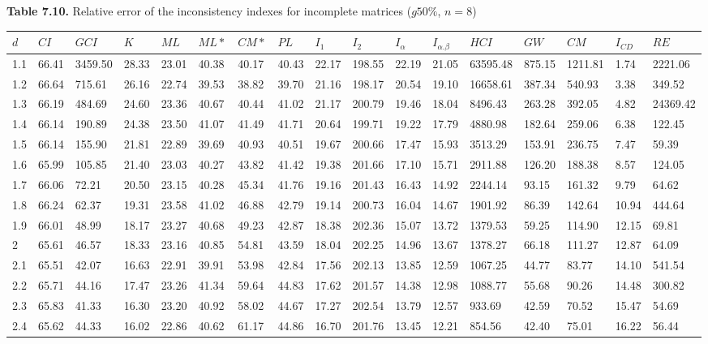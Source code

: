 \newpage
\textbf{Table 7.10.} Relative error of the inconsistency indexes for incomplete matrices ($g50\%$, $n=8$)
\begin{adjustbox}{angle=90}
  \begin{center}
    \small{    
    \begin{tabular}{|l|llllllllllllllll|}
      \hline $d$ &
$CI$&$GCI$&$K$&$ML$&$ML*$&$CM*$&$PL$&$I_1$&$I_2$&$I_{\alpha}$&$I_{\alpha.\beta}$&$HCI$&$GW$&$CM$&$I_{CD}$&$RE$\\ \hline \hline
1.1&66.41&3459.50&28.33&23.01&40.38&40.17&40.43&22.17&198.55&22.19&21.05&63595.48&875.15&1211.81&1.74&2221.06  \\ 
1.2&66.64&715.61&26.16&22.74&39.53&38.82&39.70&21.16&198.17&20.54&19.10&16658.61&387.34&540.93&3.38&349.52  \\ 
1.3&66.19&484.69&24.60&23.36&40.67&40.44&41.02&21.17&200.79&19.46&18.04&8496.43&263.28&392.05&4.82&24369.42  \\ 
1.4&66.14&190.89&24.38&23.50&41.07&41.49&41.71&20.64&199.71&19.22&17.79&4880.98&182.64&259.06&6.38&122.45  \\ 
1.5&66.14&155.90&21.81&22.89&39.69&40.93&40.51&19.67&200.66&17.47&15.93&3513.29&153.91&236.75&7.47&59.39  \\ 
1.6&65.99&105.85&21.40&23.03&40.27&43.82&41.42&19.38&201.66&17.10&15.71&2911.88&126.20&188.38&8.57&124.05  \\ 
1.7&66.06&72.21&20.50&23.15&40.28&45.34&41.76&19.16&201.43&16.43&14.92&2244.14&93.15&161.32&9.79&64.62  \\ 
1.8&66.24&62.37&19.31&23.58&41.02&46.88&42.79&19.14&200.73&16.04&14.67&1901.92&86.39&142.64&10.94&444.64  \\ 
1.9&66.01&48.99&18.17&23.27&40.68&49.23&42.87&18.38&202.36&15.07&13.72&1379.53&59.25&114.90&12.15&69.81  \\ 
2&65.61&46.57&18.33&23.16&40.85&54.81&43.59&18.04&202.25&14.96&13.67&1378.27&66.18&111.27&12.87&64.09  \\ 
2.1&65.51&42.07&16.63&22.91&39.91&53.98&42.84&17.56&202.13&13.85&12.59&1067.25&44.77&83.77&14.10&541.54  \\ 
2.2&65.71&44.16&17.47&23.26&41.34&59.64&44.83&17.62&201.57&14.38&12.98&1088.77&55.68&90.26&14.48&300.82  \\ 
2.3&65.83&41.33&16.30&23.20&40.92&58.02&44.67&17.27&202.54&13.79&12.57&933.69&42.59&70.52&15.47&54.69  \\ 
2.4&65.62&44.33&16.02&22.86&40.62&61.17&44.86&16.70&201.76&13.45&12.21&854.56&42.40&75.01&16.22&56.44  \\ 

\end{tabular}}
\end{center}
\end{adjustbox}

